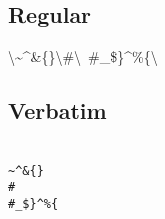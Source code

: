 \documentclass[pdftex,english,a4paper,10pt]{article}
\makeatletter
\def\docbooktolatexgobble{\expandafter\@gobble}
\makeatother
\begin{document}
\subsection{Regular}
\label{id176345}\hypertarget{id176345}{}%


    \textbackslash \textasciitilde{}\^{}\&\{\}\textbackslash \#\textbackslash \ \#\_\$\}\^{}\%\{\textbackslash 
    
\subsection{Verbatim}
\label{id176360}\hypertarget{id176360}{}%


    {\texttt{{\docbooktolatexgobble\string\\\textasciitilde{}\^{}\&\docbooktolatexgobble\string\{\docbooktolatexgobble\string\}\docbooktolatexgobble\string\\\#\docbooktolatexgobble\string\\ \#\_\$\docbooktolatexgobble\string\}\^{}\%\docbooktolatexgobble\string\{\docbooktolatexgobble\string\\}}}
    

\end{document}
